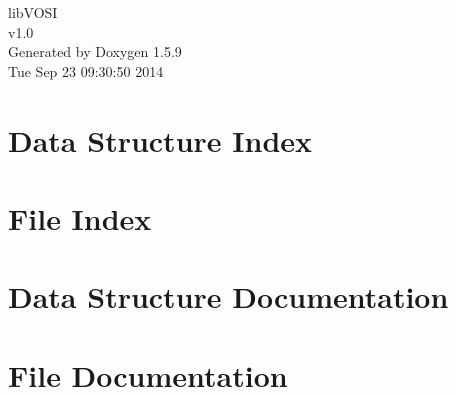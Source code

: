\documentclass[letterpaper]{book}
\begin{document}
\hypersetup{pageanchor=false}
\begin{titlepage}
\vspace*{7cm}
\begin{center}
{\Large libVOSI \\[1ex]\large v1.0 }\\
\vspace*{1cm}
{\large Generated by Doxygen 1.5.9}\\
\vspace*{0.5cm}
{\small Tue Sep 23 09:30:50 2014}\\
\end{center}
\end{titlepage}
\clearemptydoublepage
{}
\tableofcontents
\clearemptydoublepage
{}
\hypersetup{pageanchor=true}
\chapter{Data Structure Index}

\chapter{File Index}

\chapter{Data Structure Documentation}













\chapter{File Documentation}











\printindex
\end{document}
